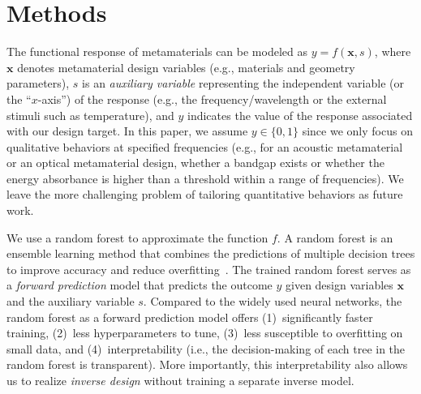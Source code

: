 \documentclass{article}
\begin{document}




\section{Methods}
\label{sec:methodology}

The functional response of metamaterials can be modeled as $y = f(\mathbf{x}, s)$, where $\mathbf{x}$ denotes metamaterial design variables (e.g., materials and geometry parameters), $s$ is an \textit{auxiliary variable} representing the independent variable (or the ``$x$-axis'') of the response (e.g., the frequency/wavelength or the external stimuli such as temperature), and $y$ indicates the value of the response associated with our design target. In this paper, we assume $y \in \{0, 1\}$ since we only focus on qualitative behaviors at specified frequencies (e.g., for an acoustic metamaterial or an optical metamaterial design, whether a bandgap exists or whether the energy absorbance is higher than a threshold within a range of frequencies). We leave the more challenging problem of tailoring quantitative behaviors as future work.

We use a random forest to approximate the function $f$. A random forest is an ensemble learning method that combines the predictions of multiple decision trees to improve accuracy and reduce overfitting~\cite{breiman2001random}. The trained random forest serves as a \textit{forward prediction} model that predicts the outcome $y$ given design variables $\mathbf{x}$ and the auxiliary variable $s$. Compared to the widely used neural networks, the random forest as a forward prediction model offers (1)~significantly faster training, (2)~less hyperparameters to tune, (3)~less susceptible to overfitting on small data, and (4)~interpretability (i.e., the decision-making of each tree in the random forest is transparent). More importantly, this interpretability also allows us to realize \textit{inverse design} without training a separate inverse model.
\end{document}
